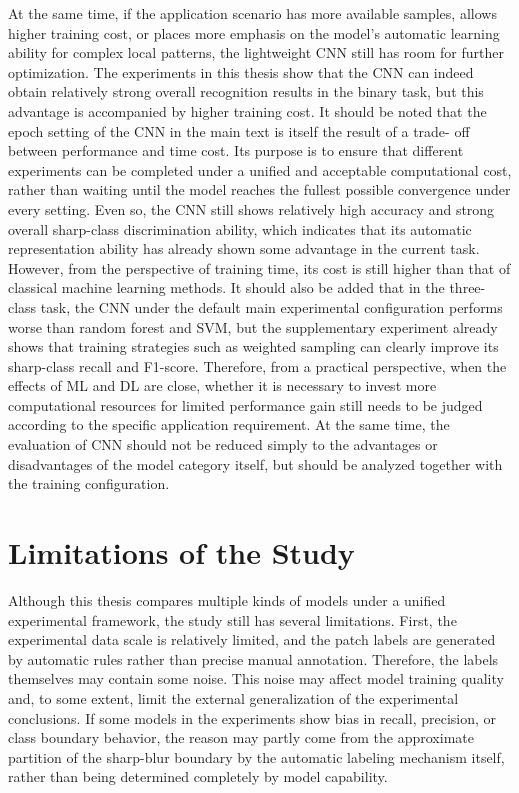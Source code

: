 \par At the same time, if the application scenario has more available samples,
allows higher training cost, or places more emphasis on the model's automatic
learning ability for complex local patterns, the lightweight CNN
\cite{lecun2002gradient,krizhevsky2012imagenet} still has room for further
optimization. The experiments in this thesis show that the CNN can indeed
obtain relatively strong overall recognition results in the binary task, but
this advantage is accompanied by higher training cost. It should be noted that
the epoch setting of the CNN in the main text is itself the result of a trade-
off between performance and time cost. Its purpose is to ensure that different
experiments can be completed under a unified and acceptable computational cost,
rather than waiting until the model reaches the fullest possible convergence
under every setting. Even so, the CNN still shows relatively high accuracy and
strong overall sharp-class discrimination ability, which indicates that its
automatic representation ability has already shown some advantage in the
current task. However, from the perspective of training time, its cost is still
higher than that of classical machine learning methods. It should also be added
that in the three-class task, the CNN under the default main experimental
configuration performs worse than random forest and SVM, but the supplementary
experiment already shows that training strategies such as weighted sampling can
clearly improve its sharp-class recall and F1-score. Therefore, from a
practical perspective, when the effects of ML and DL are close, whether it is
necessary to invest more computational resources for limited performance gain
still needs to be judged according to the specific application requirement. At
the same time, the evaluation of CNN should not be reduced simply to the
advantages or disadvantages of the model category itself, but should be
analyzed together with the training configuration.

\section{Limitations of the Study}
\par Although this thesis compares multiple kinds of models under a unified
experimental framework, the study still has several limitations. First, the
experimental data scale is relatively limited, and the patch labels are
generated by automatic rules rather than precise manual annotation. Therefore,
the labels themselves may contain some noise. This noise may affect model
training quality and, to some extent, limit the external generalization of the
experimental conclusions. If some models in the experiments show bias in
recall, precision, or class boundary behavior, the reason may partly come from
the approximate partition of the sharp-blur boundary by the automatic labeling
mechanism itself, rather than being determined completely by model capability.

